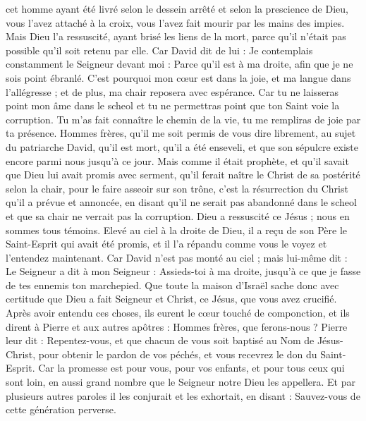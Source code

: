 \begin{multicols}{2}
cet homme ayant été livré selon le dessein arrêté et selon la prescience de Dieu, vous l'avez attaché à la croix, vous l’avez fait mourir par les mains des impies.
Mais Dieu l'a ressuscité, ayant brisé les liens de la mort, parce qu'il n'était pas possible qu'il soit retenu par elle.
Car David dit de lui : Je contemplais constamment le Seigneur devant moi : Parce qu’il est à ma droite, afin que je ne sois point ébranlé.
C'est pourquoi mon cœur est dans la joie, et ma langue dans l’allégresse ; et de plus, ma chair reposera avec espérance.
Car tu ne laisseras point mon âme dans le scheol et tu ne permettras point que ton Saint voie la corruption.
Tu m'as fait connaître le chemin de la vie, tu me rempliras de joie par ta présence.
Hommes frères, qu’il me soit permis de vous dire librement, au sujet du patriarche David, qu'il est mort, qu'il a été enseveli, et que son sépulcre existe encore parmi nous jusqu’à ce jour.
Mais comme il était prophète, et qu'il savait que Dieu lui avait promis avec serment, qu’il ferait naître le Christ de sa postérité selon la chair, pour le faire asseoir sur son trône,
c’est la résurrection du Christ qu’il a prévue et annoncée, en disant qu’il ne serait pas abandonné dans le scheol et que sa chair ne verrait pas la corruption.
Dieu a ressuscité ce Jésus ; nous en sommes tous témoins.
Elevé au ciel à la droite de Dieu, il a reçu de son Père le Saint-Esprit qui avait été promis, et il l’a répandu comme vous le voyez et l’entendez maintenant.
Car David n'est pas monté au ciel ; mais lui-même dit : Le Seigneur a dit à mon Seigneur : Assieds-toi à ma droite,
jusqu'à ce que je fasse de tes ennemis ton marchepied. 
Que toute la maison d'Israël sache donc avec certitude que Dieu a fait Seigneur et Christ, ce Jésus, que vous avez crucifié.
Après avoir entendu ces choses, ils eurent le cœur touché de componction, et ils dirent à Pierre et aux autres apôtres : Hommes frères, que ferons-nous ?
Pierre leur dit : Repentez-vous, et que chacun de vous soit baptisé au Nom de Jésus-Christ, pour obtenir le pardon de vos péchés, et vous recevrez le don du Saint-Esprit.
Car la promesse est pour vous, pour vos enfants, et pour tous ceux qui sont loin, en aussi grand nombre que le Seigneur notre Dieu les appellera.
Et par plusieurs autres paroles il les conjurait et les exhortait, en disant : Sauvez-vous de cette génération perverse.

\end{multicols}
